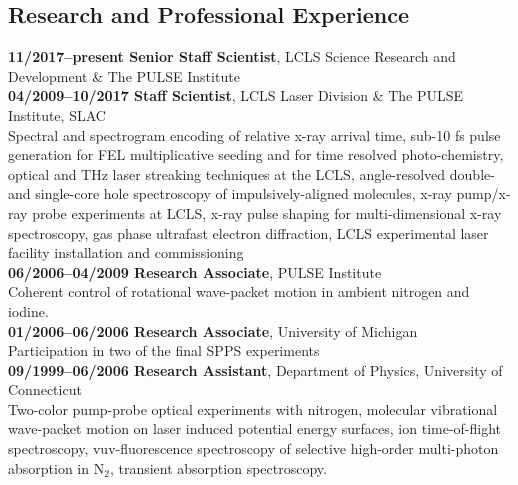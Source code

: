 \subsection*{Research and Professional Experience}
\textbf{11/2017--present Senior Staff Scientist}, LCLS Science Research and Development \& The PULSE Institute\\
\textbf{04/2009--10/2017 Staff Scientist}, LCLS Laser Division \& The PULSE Institute, SLAC\\
Spectral and spectrogram encoding of relative x-ray arrival time, 
sub-10 fs pulse generation for FEL multiplicative seeding and for time resolved photo-chemistry, 
optical and THz laser streaking techniques at the LCLS, 
angle-resolved double- and single-core hole spectroscopy of impulsively-aligned molecules, 
x-ray pump/x-ray probe experiments at LCLS, 
x-ray pulse shaping for multi-dimensional x-ray spectroscopy, 
gas phase ultrafast electron diffraction, 
LCLS experimental laser facility installation and commissioning\\
\textbf{06/2006--04/2009 Research Associate}, PULSE Institute\\
Coherent control of rotational wave-packet motion in ambient nitrogen and iodine.\\
\textbf{01/2006--06/2006 Research Associate}, University of Michigan\\
Participation in two of the final SPPS experiments\\
\textbf{09/1999--06/2006 Research Assistant}, Department of Physics, University of Connecticut\\
Two-color pump-probe optical experiments with nitrogen, 
molecular vibrational wave-packet motion on laser induced potential energy surfaces, 
ion time-of-flight spectroscopy, 
vuv-fluorescence spectroscopy of selective high-order multi-photon absorption in N$_2$, 
transient absorption spectroscopy.


